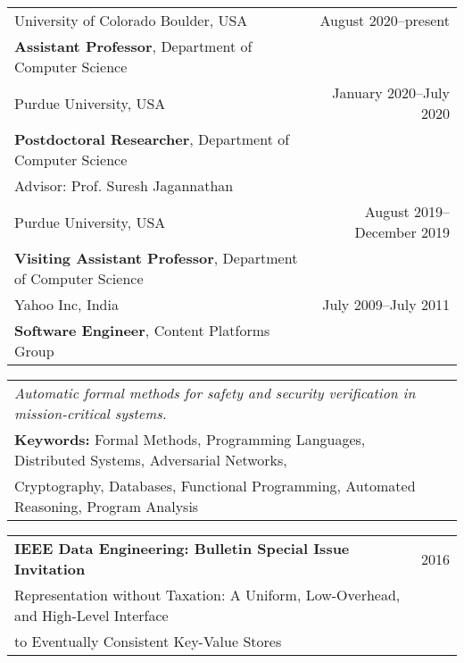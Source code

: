 \documentclass{article}
\begin{document}
\begin{center}
  \begin{tabular}{ p{10cm}  r}
    University of Colorado Boulder, USA  & August 2020--present \\
    {\bf Assistant Professor}, Department of Computer Science &\\[12pt]

    Purdue University, USA & January 2020--July 2020 \\
    {\bf Postdoctoral Researcher}, Department of Computer Science &\\
    Advisor: Prof. Suresh Jagannathan &\\[12pt]

    Purdue University, USA & August 2019--December 2019 \\
    {\bf Visiting Assistant Professor}, Department of Computer Science &\\[12pt]

    Yahoo Inc, India & July 2009--July 2011 \\
    {\bf Software Engineer}, Content Platforms Group &\\[12pt]
    \end{tabular}
\end{center}


\begin{center}
  \begin{tabular}{ l  r }
    \emph{Automatic formal methods for safety and security verification in mission-critical systems.} & \\ [5pt]
{\bf Keywords:} Formal Methods, Programming Languages, Distributed Systems,
Adversarial Networks, &\\
Cryptography, Databases, Functional Programming, Automated Reasoning, Program Analysis&\\ 
\end{tabular}
\end{center}


\vspace{1em}
\begin{center}
  \begin{tabular}{ p{15cm}  r }
    {\bf IEEE Data Engineering: Bulletin Special Issue Invitation} & 2016\\ [3pt]
    \hspace{2em} Representation without Taxation: A Uniform, Low-Overhead,
    and High-Level Interface & \\
    \hspace{2em} to Eventually Consistent Key-Value Stores   & \\[6pt]
    \end{tabular}
\end{center}
\end{document}
